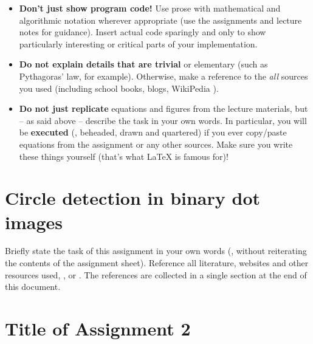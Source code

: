 \documentclass[notitlepage,english]{hgbreport}
\begin{document}
\begin{itemize}
\item
\textbf{Don't just show program code!}
Use prose with mathematical and algorithmic notation wherever appropriate (use the assignments
and lecture notes for guidance).
Insert actual code sparingly and only to show particularly interesting or critical parts 
of your implementation.
\item
\textbf{Do not explain details that are trivial} or elementary (such as Pythagoras' law, 
for example). Otherwise, make a reference to the \textit{all} sources 
you used (including school books, blogs, WikiPedia \etc).
\item
\textbf{Do not just replicate} equations and figures from the lecture materials, but
-- as said above -- describe the task in your own words. 
In particular, you will be \textbf{executed} (\ie, beheaded, drawn and quartered) if you
ever copy/paste equations from the assignment or
any other sources. Make sure you write these things yourself (that's what LaTeX is 
famous for)!
\end{itemize}







\chapter{Circle detection in binary dot images}

Briefly state the task of this assignment in your own words (\ie, without reiterating the
contents of the assignment sheet). Reference all literature, websites and other resources used,
\eg, \cite{Higham1998,Guttman2001} or \cite{Mermin1989}. 
The references are collected in a single section at the end of this document.







\chapter{Title of Assignment 2}


\end{document}
